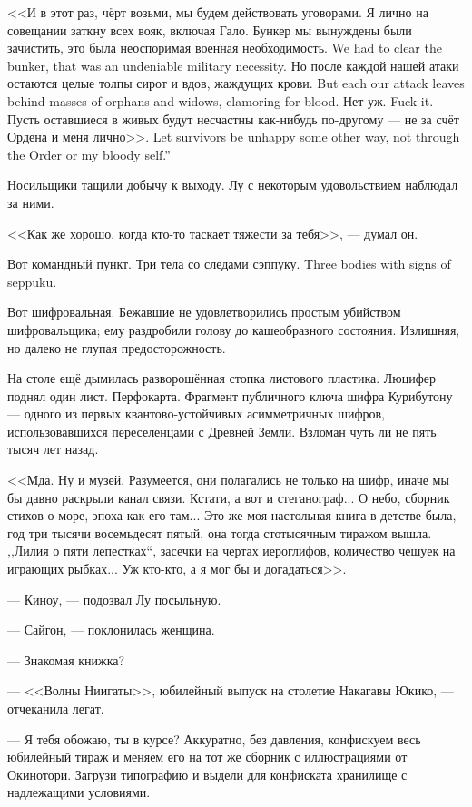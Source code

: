 <<И в этот раз, чёрт возьми, мы будем действовать уговорами.
Я лично на совещании заткну всех вояк, включая Гало.
{Бункер мы вынуждены были зачистить, это была неоспоримая военная необходимость.}
{We had to clear the bunker, that was an undeniable military necessity.}
{Но после каждой нашей атаки остаются целые толпы сирот и вдов, жаждущих крови.}
{But each our attack leaves behind masses of orphans and widows, clamoring for blood.}
{Нет уж.}
{Fuck it.}
{Пусть оставшиеся в живых будут несчастны как-нибудь по-другому --- не за счёт Ордена и меня лично>>.}
{Let survivors be unhappy some other way, not through the Order or my bloody self.''}

Носильщики тащили добычу к выходу.
Лу с некоторым удовольствием наблюдал за ними.

<<Как же хорошо, когда кто-то таскает тяжести за тебя>>, --- думал он.

Вот командный пункт.
{Три тела со следами сэппуку.}
{Three bodies with signs of seppuku.}

Вот шифровальная.
Бежавшие не удовлетворились простым убийством шифровальщика;
ему раздробили голову до кашеобразного состояния.
Излишняя, но далеко не глупая предосторожность.

На столе ещё дымилась разворошённая стопка листового пластика.
Люцифер поднял один лист.
Перфокарта.
Фрагмент публичного ключа шифра Курибутону --- одного из первых квантово-устойчивых асимметричных шифров, использовавшихся переселенцами с Древней Земли. %
Взломан чуть ли не пять тысяч лет назад.

<<Мда.
Ну и музей.
Разумеется, они полагались не только на шифр, иначе мы бы давно раскрыли канал связи.
Кстати, а вот и стеганограф...
О небо, сборник стихов о море, эпоха как его там...
Это же моя настольная книга в детстве была, год три тысячи восемьдесят пятый, она тогда стотысячным тиражом вышла.
,,Лилия о пяти лепестках``, засечки на чертах иероглифов, количество чешуек на играющих рыбках...
Уж кто-кто, а я мог бы и догадаться>>.

--- Киноу, --- подозвал Лу посыльную.

--- Сайгон, --- поклонилась женщина.

--- Знакомая книжка?

--- <<Волны Ниигаты>>, юбилейный выпуск на столетие Накагавы Юкико, --- отчеканила легат.

--- Я тебя обожаю, ты в курсе?
Аккуратно, без давления, конфискуем весь юбилейный тираж и меняем его на тот же сборник с иллюстрациями от Окинотори.
Загрузи типографию и выдели для конфиската хранилище с надлежащими условиями.

